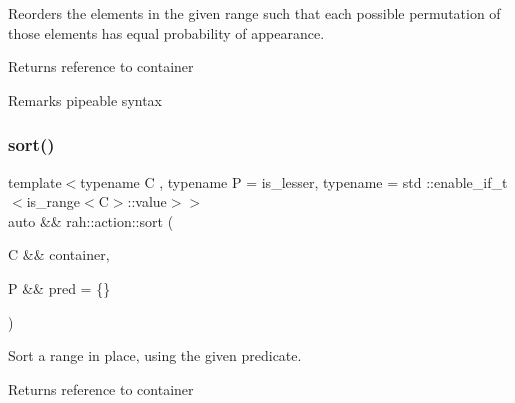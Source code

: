 Reorders the elements in the given range such that each possible permutation of those elements has equal probability of appearance. 

\begin{DoxyReturn}{Returns}
reference to container 
\end{DoxyReturn}
\begin{DoxyRemark}{Remarks}
pipeable syntax
\end{DoxyRemark}

\begin{DoxyCodeInclude}{0}
\end{DoxyCodeInclude}
\mbox{\label{namespacerah_1_1action_a2bddee3b65a2ecf86d2c3ac49bb41183}} 
\subsubsection{\texorpdfstring{sort()}{sort()}\hspace{0.1cm}{\footnotesize\ttfamily [1/2]}}
{\footnotesize\ttfamily template$<$typename C , typename P  = is\+\_\+lesser, typename  = std \+::enable\+\_\+if\+\_\+t$<$is\+\_\+range$<$\+C$>$\+::value$>$$>$ \\
auto \&\& rah\+::action\+::sort (\begin{DoxyParamCaption}\item[{C \&\&}]{container,  }\item[{P \&\&}]{pred = {\ttfamily \{\}} }\end{DoxyParamCaption})}



Sort a range in place, using the given predicate. 

\begin{DoxyReturn}{Returns}
reference to container
\end{DoxyReturn}

\begin{DoxyCodeInclude}{0}
\end{DoxyCodeInclude}

